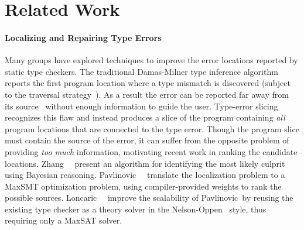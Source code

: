 \section{Related Work}
\label{sec:related-work}


\paragraph{Localizing and Repairing Type Errors}
\label{sec:diagnosis-repair}
%
Many groups have explored techniques to improve the error locations
reported by static type checkers.
%
The traditional Damas-Milner type inference algorithm~\cite{Damas1982-uw}
reports the first program location where a type mismatch is discovered
(subject to the traversal strategy~\cite{Lee1998-ys}).
%
As a result the error can be reported far away from its
source~\cite{McAdam1998-ub} without enough information to guide the
user.
%
Type-error slicing~\cite{Haack2003-vc,Schilling2011-yf,Rahli2015-tt,Sagonas2013-bf,Gast2004-zd,Neubauer2003-xv}
recognizes this flaw and instead produces a slice of the program
containing \emph{all} program locations that are connected to the type
error.
%
%
Though the program slice must contain the source of the error, it can
suffer from the opposite problem of providing \emph{too much}
information, motivating recent work in ranking the candidate locations.
%
Zhang~\etal~ present an algorithm for
identifying the most likely culprit using Bayesian reasoning.
%
Pavlinovic~\etal~
translate the %
localization problem to a MaxSMT optimization problem, using
compiler-provided weights to rank the possible sources.
%
Loncaric~\etal~ improve the scalability of
Pavlinovic~\etal by reusing the existing type checker as
a theory solver in the Nelson-Oppen~
style, thus requiring only a MaxSAT solver.

